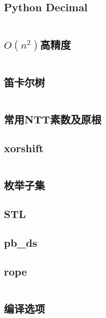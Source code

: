 \documentclass[a4paper]{article}
\begin{document}
\begin{multicols}{2}
				\subsection{Python Decimal}
					\inputminted{python}{../src/misc/decimal.py}
				
				\subsection{$O(n^2)$高精度}
					\inputminted{cpp}{../src/misc/高精度.cpp}
				
				\subsection{笛卡尔树}
					\inputminted{cpp}{../src/misc/笛卡尔树.cpp}
				
				\subsection{常用NTT素数及原根}
					

				\subsection{xorshift}
					\inputminted{cpp}{../src/misc/xorshift.cpp}
				
				\subsection{枚举子集}
					
					
				\subsection{STL}
					

				\subsection{pb\_ds}
					

				\subsection{rope}
					\inputminted{cpp}{../src/misc/rope.cpp}
				
				\subsection{编译选项}
					
					

\end{multicols}
\end{document}
